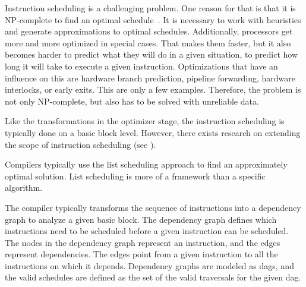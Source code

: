 Instruction scheduling is a challenging problem.
One reason for that is that it is NP-complete to find an optimal schedule~\cite{hennessy1983postpass}.
It is necessary to work with heuristics and generate approximations to optimal schedules.
Additionally, processors get more and more optimized in special cases.
That makes them faster, but it also becomes harder to predict what they will do in a given situation, \ie to predict how long it will take to execute a given instruction.
Optimizations that have an influence on this are hardware branch prediction, pipeline forwarding, hardware interlocks, or early exits.
This are only a few examples.
Therefore, the problem is not only NP-complete, but also has to be solved with unreliable data.

Like the transformations in the optimizer stage, the instruction scheduling is typically done on a basic block level.
However, there exists research on extending the scope of instruction scheduling (see ).

Compilers typically use the list scheduling approach to find an approximately optimal solution.
List scheduling is more of a framework than a specific algorithm.

The compiler typically transforms the sequence of instructions into a dependency graph to analyze a given basic block.
The dependency graph defines which instructions need to be scheduled before a given instruction can be scheduled.
The nodes in the dependency graph represent an instruction, and the edges represent dependencies.
The edges point from a given instruction to all the instructions on which it depends.
Dependency graphs are modeled as \acp{dag}, and the valid schedules are defined as the set of the valid traversals for the given \ac{dag}.

